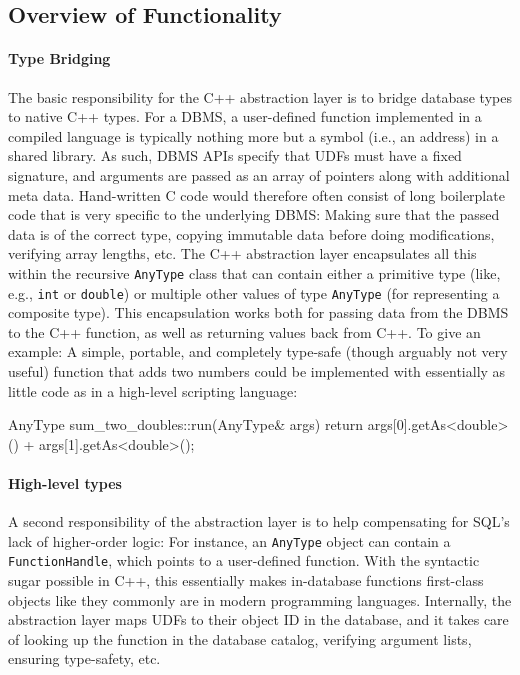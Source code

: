 \subsection{Overview of Functionality} \label{sec:C++AL:Classes}

\paragraph{Type Bridging}

The basic responsibility for the C++ abstraction layer is to bridge database types to native C++ types. For a DBMS, a user-defined function implemented in a compiled language is typically nothing more but a symbol (i.e., an address) in a shared library. As such, DBMS APIs specify that UDFs must have a fixed signature, and arguments are passed as an array of pointers along with additional meta data. Hand-written C code would therefore often consist of long boilerplate code that is very specific to the underlying DBMS: Making sure that the passed data is of the correct type, copying immutable data before doing modifications, verifying array lengths, etc. The C++ abstraction layer encapsulates all this within the recursive \texttt{AnyType} class that can contain either a primitive type (like, e.g., \texttt{int} or \texttt{double}) or multiple other values of type \texttt{AnyType} (for representing a composite type). This encapsulation works both for passing data from the DBMS to the C++ function, as well as returning values back from C++. To give an example: A simple, portable, and completely type-safe (though arguably not very useful) function that adds two numbers could be implemented with essentially as little code as in a high-level scripting language:
\begin{cpp}
    AnyType
    sum_two_doubles::run(AnyType& args) {
        return args[0].getAs<double>()
             + args[1].getAs<double>();
    }
\end{cpp}

\paragraph{High-level types}

A second responsibility of the abstraction layer is to help compensating for SQL's lack of higher-order logic: For instance, an \texttt{AnyType} object can contain a \texttt{FunctionHandle}, which points to a user-defined function. With the syntactic sugar possible in C++, this essentially makes in-database functions first-class objects like they commonly are in modern programming languages. Internally, the abstraction layer maps UDFs to their object ID in the database, and it takes care of looking up the function in the database catalog, verifying argument lists, ensuring type-safety, etc.


